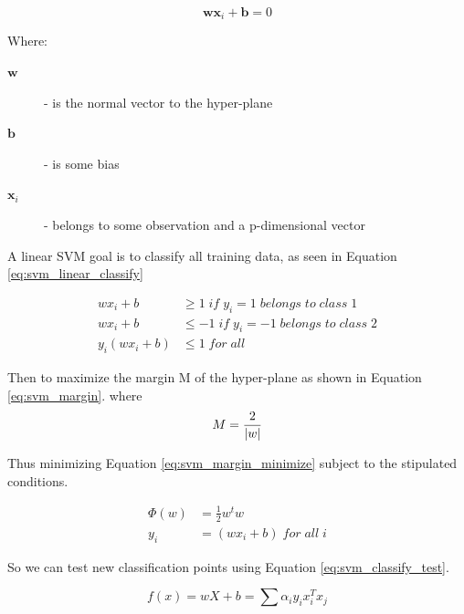 \documentclass[conference]{sig-alternate-05-2015}
\DeclarePairedDelimiter\abs{\lvert}{\rvert}%
\begin{document}
\noindent\hrulefill
\begin{equation}
  \label{eq:svm_linear}
  \textbf{w}\textbf{x}_i + \textbf{b} = 0
\end{equation}

\noindent Where:
\begin{description}
  \item[$\textbf{w}$] - is the normal vector to the hyper-plane
  \item[$\textbf{b}$] - is some bias
  \item[$\textbf{x}_i$] - belongs to some observation and a p-dimensional vector
\end{description}
\noindent\hrulefill

A linear SVM goal is to classify all training data, as seen in Equation
\ref{eq:svm_linear_classify}

\begin{equation}
  \label{eq:svm_linear_classify}
  \begin{aligned}
    wx_i +b &\geq 1 \;if \; y_i=1 \; belongs\; to \;class \;1 \\
    wx_i +b &\leq -1 \; if \; y_i=-1  \; belongs\; to \;class \;2 \\
    y_i(wx_i+b) &\leq 1\; for \;all \;
  \end{aligned}
\end{equation}

Then to maximize the margin M of the hyper-plane as shown in Equation
\ref{eq:svm_margin}. where $ $\\

\begin{equation}
  \label{eq:svm_margin}
  M = \frac{2}{\abs{w}}
\end{equation}

Thus minimizing Equation \ref{eq:svm_margin_minimize} subject to the stipulated
conditions.

\begin{equation}
  \label{eq:svm_margin_minimize}
  \begin{aligned}
    \Phi(w) &= \frac{1}{2} w^{t}w \\
    y_i &= (wx_i + b) \; for \;all \; i
  \end{aligned}
\end{equation}

So we can test new classification points using Equation
\ref{eq:svm_classify_test}.

\begin{equation}
  \label{eq:svm_classify_test}
  f(x) = wX+b = \sum \alpha_i y_i x_i ^ T x_j
\end{equation}
\end{document}
